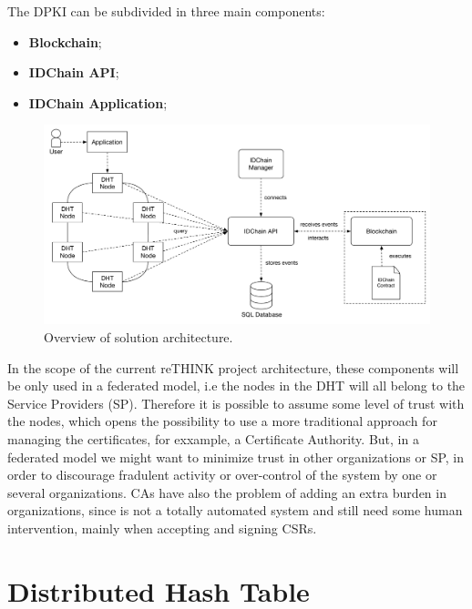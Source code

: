 The DPKI can be subdivided in three main components:
\begin{itemize}
	\item \textbf{Blockchain};
	\item \textbf{IDChain API};
	\item \textbf{IDChain Application};
\end{itemize}

\begin{figure}
  \includegraphics[width=\linewidth]{Figures/architecture-overview.pdf}
    \caption{Overview of solution architecture.}
\label{fig:architecture-overview}
\end{figure}

In the scope of the current reTHINK project architecture, these components will be only used in a federated model, i.e the nodes in the \ac{DHT} will all belong to the Service Providers (SP).
Therefore it is possible to assume some level of trust with the nodes, which opens the possibility to use a more traditional approach for managing the certificates, for exxample, a Certificate Authority.
But, in a federated model we might want to minimize trust in other organizations or SP, in order to discourage fradulent activity or over-control of the system by one or several organizations.
\acp{CA} have also the problem of adding an extra burden in organizations, since is not a totally automated system and still need some human intervention, mainly when accepting and signing \acp{CSR}.


\section{Distributed Hash Table}\label{ssec:dht}

